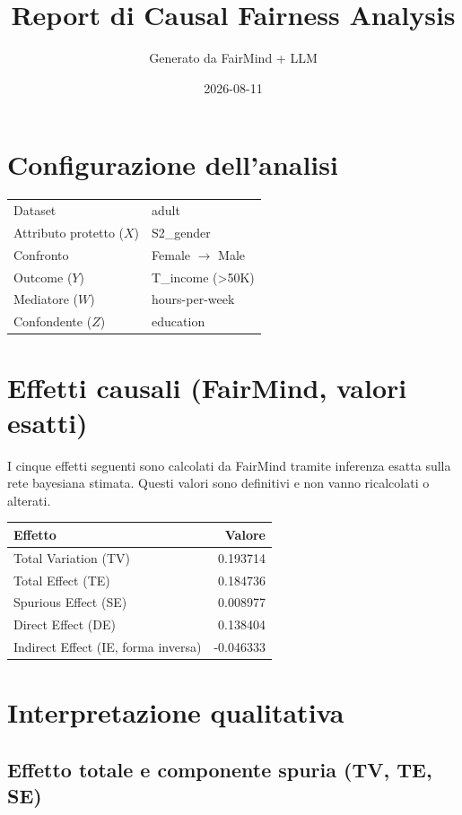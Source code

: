 \documentclass[11pt]{article}
\title{Report di Causal Fairness Analysis}
\author{Generato da FairMind + LLM}
\date{2026-08-11}
\begin{document}
\maketitle

\section{Configurazione dell'analisi}

\begin{tabular}{ll}
\toprule
Dataset & adult \\
Attributo protetto ($X$) & S2\_gender \\
Confronto & Female $\to$ Male \\
Outcome ($Y$) & T\_income (>50K) \\
Mediatore ($W$) & hours-per-week \\
Confondente ($Z$) & education \\
\bottomrule
\end{tabular}

\section{Effetti causali (FairMind, valori esatti)}

I cinque effetti seguenti sono calcolati da FairMind tramite inferenza esatta
sulla rete bayesiana stimata. Questi valori sono definitivi e non vanno
ricalcolati o alterati.

\begin{tabular}{lr}
\toprule
Effetto & Valore \\
\midrule
Total Variation (TV) & 0.193714 \\
Total Effect (TE) & 0.184736 \\
Spurious Effect (SE) & 0.008977 \\
Direct Effect (DE) & 0.138404 \\
Indirect Effect (IE, forma inversa) & -0.046333 \\
\bottomrule
\end{tabular}

\section{Interpretazione qualitativa}

\subsection{Effetto totale e componente spuria (TV, TE, SE)}
\end{document}
